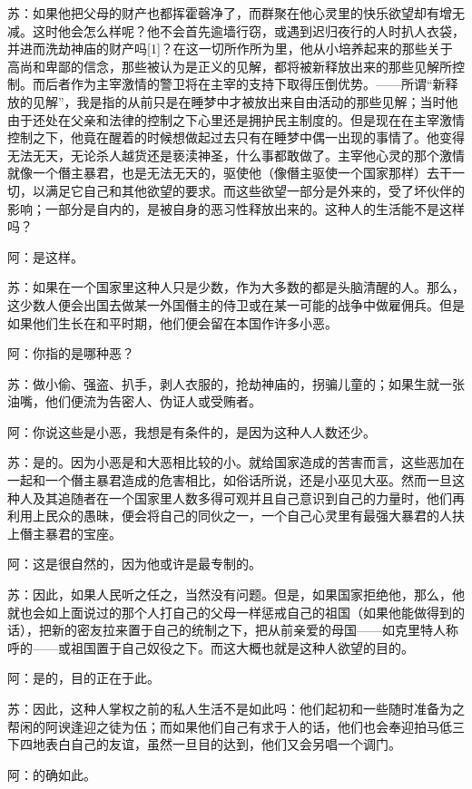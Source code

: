 \documentclass[12pt,oneside]{book}
\begin{document}
苏：如果他把父母的财产也都挥霍磬净了，而群聚在他心灵里的快乐欲望却有增无减。这时他会怎么样呢？他不会首先逾墙行窃，或遇到迟归夜行的人时扒人衣袋，并进而洗劫神庙的财产吗[1]？在这一切所作所为里，他从小培养起来的那些关于高尚和卑鄙的信念，那些被认为是正义的见解，都将被新释放出来的那些见解所控制。而后者作为主宰激情的警卫将在主宰的支持下取得压倒优势。——所谓“新释放的见解”，我是指的从前只是在睡梦中才被放出来自由活动的那些见解；当时他由于还处在父亲和法律的控制之下心里还是拥护民主制度的。但是现在在主宰激情控制之下，他竟在醒着的时候想做起过去只有在睡梦中偶一出现的事情了。他变得无法无天，无论杀人越货还是亵渎神圣，什么事都敢做了。主宰他心灵的那个激情就像一个僭主暴君，也是无法无天的，驱使他（像僭主驱使一个国家那样）去干一切，以满足它自己和其他欲望的要求。而这些欲望一部分是外来的，受了坏伙伴的影响；一部分是自内的，是被自身的恶习性释放出来的。这种人的生活能不是这样吗？

阿：是这样。

苏：如果在一个国家里这种人只是少数，作为大多数的都是头脑清醒的人。那么，这少数人便会出国去做某一外国僭主的侍卫或在某一可能的战争中做雇佣兵。但是如果他们生长在和平时期，他们便会留在本国作许多小恶。

阿：你指的是哪种恶？

苏：做小偷、强盗、扒手，剥人衣服的，抢劫神庙的，拐骗儿童的；如果生就一张油嘴，他们便流为告密人、伪证人或受贿者。

阿：你说这些是小恶，我想是有条件的，是因为这种人人数还少。

苏：是的。因为小恶是和大恶相比较的小。就给国家造成的苦害而言，这些恶加在一起和一个僭主暴君造成的危害相比，如俗话所说，还是小巫见大巫。然而一旦这种人及其追随者在一个国家里人数多得可观并且自己意识到自己的力量时，他们再利用上民众的愚昧，便会将自己的同伙之一，一个自己心灵里有最强大暴君的人扶上僭主暴君的宝座。

阿：这是很自然的，因为他或许是最专制的。

苏：因此，如果人民听之任之，当然没有问题。但是，如果国家拒绝他，那么，他就也会如上面说过的那个人打自己的父母一样惩戒自己的祖国（如果他能做得到的话），把新的密友拉来置于自己的统制之下，把从前亲爱的母国——如克里特人称呼的——或祖国置于自己奴役之下。而这大概也就是这种人欲望的目的。

阿：是的，目的正在于此。

苏：因此，这种人掌权之前的私人生活不是如此吗：他们起初和一些随时准备为之帮闲的阿谀逢迎之徒为伍；而如果他们自己有求于人的话，他们也会奉迎拍马低三下四地表白自己的友谊，虽然一旦目的达到，他们又会另唱一个调门。

阿：的确如此。
\end{document}
